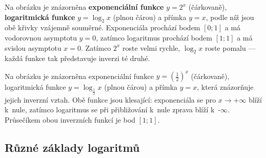 \documentclass[12pt,a4paper]{article}
\begin{document}
Na obrázku je znázorněna \textbf{exponenciální funkce} $y = 2^x$ (čárkovaně), 
\textbf{logaritmická funkce} $y = \log_2 x$ (plnou čárou) a přímka $y = x$, 
podle níž jsou obě křivky vzájemně souměrné. 
Exponenciála prochází bodem $[0;1]$ a má vodorovnou asymptotu $y = 0$, 
zatímco logaritmus prochází bodem $[1;1]$ a má svislou asymptotu $x = 0$. 
Zatímco $2^x$ roste velmi rychle, $\log_2 x$ roste pomalu — 
každá funkce tak představuje inverzi té druhé.


\begin{center}
\end{center}

Na obrázku je znázorněna exponenciální funkce $y = \left(\tfrac12\right)^x$ (čárkovaně),
logaritmická funkce $y = \log_{\frac12} x$ (plnou čárou) a přímka $y = x$, 
která znázorňuje jejich inverzní vztah. 
Obě funkce jsou klesající: exponenciála se pro $x \to +\infty$ blíží k~nule, 
zatímco logaritmus se při přibližování k~nule zprava blíží k~-\(\infty\). 
Průsečíkem obou inverzních funkcí je bod $[1;1]$.



\subsection{Různé základy logaritmů}
\end{document}
